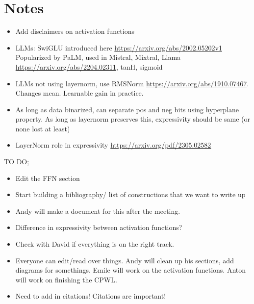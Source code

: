 \documentclass{article}
\begin{document}
\section{Notes}
\begin{itemize}
    \item Add disclaimers on activation functions
    \item LLMs: SwiGLU introduced here \url{https://arxiv.org/abs/2002.05202v1} Popularized by PaLM, used in Mistral, Mixtral, Llama \url{https://arxiv.org/abs/2204.02311}, tanH, sigmoid
    \item LLMs not using layernorm, use RMSNorm \url{https://arxiv.org/abs/1910.07467}. Changes mean. Learnable gain in practice. 
    \item As long as data binarized, can separate pos and neg bits using hyperplane property. As long as layernorm preserves this, expressivity should be same (or none lost at least)
    \item LayerNorm role in expressivity \url{https://arxiv.org/pdf/2305.02582}
\end{itemize}

TO DO;
\begin{itemize}
    \item Edit the FFN section
    \item Start building a bibliography/ list of constructions that we want to write up
    \item Andy will make a document for this after the meeting.
    \item Difference in expressivity between activation functions?
    \item Check with David if everything is on the right track.
    \item Everyone can edit/read over things. Andy will clean up his sections, add diagrams for somethings. Emile will work on the activation functions. Anton will work on finishing the CPWL. 
    \item Need to add in citations! Citations are important!
\end{itemize}



\end{document}
